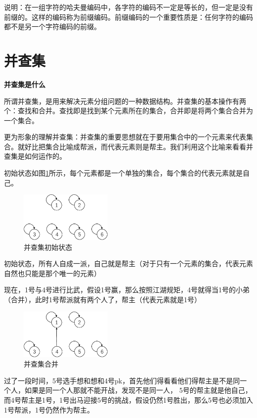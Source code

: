 \documentclass[lang=cn,newtx,10pt,scheme=chinese]{../elegantbook}
\begin{document}
说明：在一组字符的哈夫曼编码中，各字符的编码不一定是等长的，但一定是没有前缀的。这样的编码称为前缀编码。前缀编码的一个重要性质是：任何字符的编码都不是另一个字符编码的前缀。
\section{并查集}

\textbf{并查集是什么}

所谓并查集，是用来解决元素分组问题的一种数据结构。并查集的基本操作有两个：查找和合并。查找即是找到某个元素所在的集合，合并即是将两个集合合并为一个集合。

更为形象的理解并查集：并查集的重要思想就在于要用集合中的一个元素来代表集合。就好比把集合比喻成帮派，而代表元素则是帮主。我们利用这个比喻来看看并查集是如何运作的。

初始状态如图\ref{fig:unionFind1}所示，每个元素都是一个单独的集合，每个集合的代表元素就是自己。

\begin{figure}[!htbp]
  \centering
  \includegraphics[width=0.4\textwidth]{./figure/pdf/cropped/unionFindExample(a).pdf}
  \caption{并查集初始状态}
  \label{fig:unionFind1}
\end{figure}

初始状态，所有人自成一派，自己就是帮主（对于只有一个元素的集合，代表元素自然也只能是那个唯一的元素）

现在，1号与4号进行比武，假设1号赢，那么按照江湖规矩，4号就得当1号的小弟（合并），此时1号帮派就有两个人了，帮主（代表元素就是1号）

\begin{figure}[!htbp]
  \centering
  \includegraphics[width=0.4\textwidth]{./figure/pdf/cropped/unionFindExample(b).pdf}
  \caption{并查集合并}
  \label{fig:unionFind2}
\end{figure}

过了一段时间，5号选手想和想和4号pk，首先他们得看看他们得帮主是不是同一个人，如果是同一个人那就不能开战，发现不是同一人，
5号的帮主就是他自己，而4号帮主是1号，1号出马迎接5号的挑战，假设仍然1号胜出，那么5号也必须加入1号帮派，1号仍然作为帮主。
\end{document}
